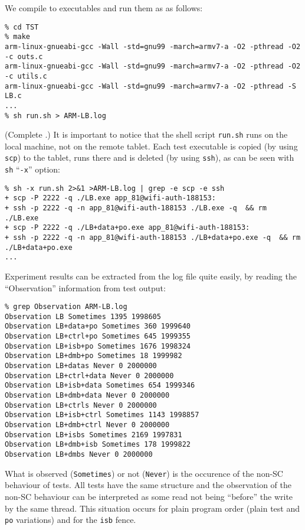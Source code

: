 We compile to executables and run them  as as follows:
\begin{verbatim}
% cd TST
% make
arm-linux-gnueabi-gcc -Wall -std=gnu99 -march=armv7-a -O2 -pthread -O2 -c outs.c
arm-linux-gnueabi-gcc -Wall -std=gnu99 -march=armv7-a -O2 -pthread -O2 -c utils.c
arm-linux-gnueabi-gcc -Wall -std=gnu99 -march=armv7-a -O2 -pthread -S LB.c
...
% sh run.sh > ARM-LB.log
\end{verbatim}
\ifhevea(Complete .) \fi
It is important to notice that the shell script \texttt{run.sh} runs
on the local machine, not on the remote tablet.
Each test executable is copied (by using \texttt{scp}) to the tablet, runs there
and is deleted (by using \texttt{ssh}), as can be seen with \texttt{sh}
``\texttt{-x}'' option:
\begin{verbatim}
% sh -x run.sh 2>&1 >ARM-LB.log | grep -e scp -e ssh
+ scp -P 2222 -q ./LB.exe app_81@wifi-auth-188153:
+ ssh -p 2222 -q -n app_81@wifi-auth-188153 ./LB.exe -q  && rm ./LB.exe
+ scp -P 2222 -q ./LB+data+po.exe app_81@wifi-auth-188153:
+ ssh -p 2222 -q -n app_81@wifi-auth-188153 ./LB+data+po.exe -q  && rm ./LB+data+po.exe
...
\end{verbatim}


Experiment results can be extracted from the log file quite easily,
by reading the ``Observation'' information from test output:
\begin{verbatim}
% grep Observation ARM-LB.log
Observation LB Sometimes 1395 1998605
Observation LB+data+po Sometimes 360 1999640
Observation LB+ctrl+po Sometimes 645 1999355
Observation LB+isb+po Sometimes 1676 1998324
Observation LB+dmb+po Sometimes 18 1999982
Observation LB+datas Never 0 2000000
Observation LB+ctrl+data Never 0 2000000
Observation LB+isb+data Sometimes 654 1999346
Observation LB+dmb+data Never 0 2000000
Observation LB+ctrls Never 0 2000000
Observation LB+isb+ctrl Sometimes 1143 1998857
Observation LB+dmb+ctrl Never 0 2000000
Observation LB+isbs Sometimes 2169 1997831
Observation LB+dmb+isb Sometimes 178 1999822
Observation LB+dmbs Never 0 2000000
\end{verbatim}
What is observed (\texttt{Sometimes}) or not (\texttt{Never}) is the occurence
of the non-SC behaviour of tests. All tests have the same structure
and the observation of the non-SC behaviour can be interpreted as
some read not being ``before'' the write by the same thread.
This situation occurs for plain program order (plain test  and
\texttt{po} variations) and for the \texttt{isb} fence.

